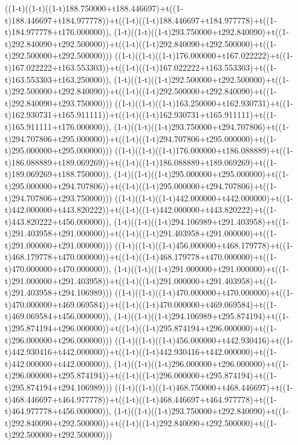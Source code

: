 ((1-t)((1-t)((1-t)188.750000+t188.446697)+t((1-t)188.446697+t184.977778))+t((1-t)((1-t)188.446697+t184.977778)+t((1-t)184.977778+t176.000000)),                                     (1-t)((1-t)((1-t)293.750000+t292.840090)+t((1-t)292.840090+t292.500000))+t((1-t)((1-t)292.840090+t292.500000)+t((1-t)292.500000+t292.500000)))
((1-t)((1-t)((1-t)176.000000+t167.022222)+t((1-t)167.022222+t163.553303))+t((1-t)((1-t)167.022222+t163.553303)+t((1-t)163.553303+t163.250000)),                                     (1-t)((1-t)((1-t)292.500000+t292.500000)+t((1-t)292.500000+t292.840090))+t((1-t)((1-t)292.500000+t292.840090)+t((1-t)292.840090+t293.750000)))
((1-t)((1-t)((1-t)163.250000+t162.930731)+t((1-t)162.930731+t165.911111))+t((1-t)((1-t)162.930731+t165.911111)+t((1-t)165.911111+t176.000000)),                                     (1-t)((1-t)((1-t)293.750000+t294.707806)+t((1-t)294.707806+t295.000000))+t((1-t)((1-t)294.707806+t295.000000)+t((1-t)295.000000+t295.000000)))
((1-t)((1-t)((1-t)176.000000+t186.088889)+t((1-t)186.088889+t189.069269))+t((1-t)((1-t)186.088889+t189.069269)+t((1-t)189.069269+t188.750000)),                                     (1-t)((1-t)((1-t)295.000000+t295.000000)+t((1-t)295.000000+t294.707806))+t((1-t)((1-t)295.000000+t294.707806)+t((1-t)294.707806+t293.750000)))
((1-t)((1-t)((1-t)442.000000+t442.000000)+t((1-t)442.000000+t443.820222))+t((1-t)((1-t)442.000000+t443.820222)+t((1-t)443.820222+t456.000000)),                                     (1-t)((1-t)((1-t)294.106989+t291.403958)+t((1-t)291.403958+t291.000000))+t((1-t)((1-t)291.403958+t291.000000)+t((1-t)291.000000+t291.000000)))
((1-t)((1-t)((1-t)456.000000+t468.179778)+t((1-t)468.179778+t470.000000))+t((1-t)((1-t)468.179778+t470.000000)+t((1-t)470.000000+t470.000000)),                                     (1-t)((1-t)((1-t)291.000000+t291.000000)+t((1-t)291.000000+t291.403958))+t((1-t)((1-t)291.000000+t291.403958)+t((1-t)291.403958+t294.106989)))
((1-t)((1-t)((1-t)470.000000+t470.000000)+t((1-t)470.000000+t469.069584))+t((1-t)((1-t)470.000000+t469.069584)+t((1-t)469.069584+t456.000000)),                                     (1-t)((1-t)((1-t)294.106989+t295.874194)+t((1-t)295.874194+t296.000000))+t((1-t)((1-t)295.874194+t296.000000)+t((1-t)296.000000+t296.000000)))
((1-t)((1-t)((1-t)456.000000+t442.930416)+t((1-t)442.930416+t442.000000))+t((1-t)((1-t)442.930416+t442.000000)+t((1-t)442.000000+t442.000000)),                                     (1-t)((1-t)((1-t)296.000000+t296.000000)+t((1-t)296.000000+t295.874194))+t((1-t)((1-t)296.000000+t295.874194)+t((1-t)295.874194+t294.106989)))
((1-t)((1-t)((1-t)468.750000+t468.446697)+t((1-t)468.446697+t464.977778))+t((1-t)((1-t)468.446697+t464.977778)+t((1-t)464.977778+t456.000000)),                                     (1-t)((1-t)((1-t)293.750000+t292.840090)+t((1-t)292.840090+t292.500000))+t((1-t)((1-t)292.840090+t292.500000)+t((1-t)292.500000+t292.500000)))

